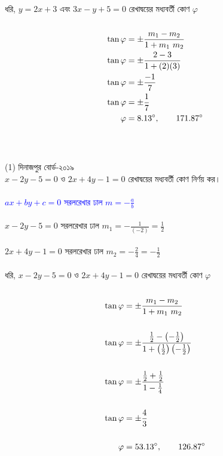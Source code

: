 \documentclass{article}
\begin{document}
\\
ধরি, $y=2x+3$ এবং $3x-y+5=0$ রেখাদ্বয়ের মধ্যবর্তী কোণ $\varphi$\\
\\
\begin{align*}
	\tan \varphi 	&=\pm \frac{m_1-m_2}{1+m_1\,\,m_2}\\
	\tan \varphi 	&=\pm \frac{2-3}{1+(2)(3)}\\
	\tan \varphi 	&=\pm \frac{-1}{7}\\	
	\tan \varphi&=\pm \frac{1}{7}\\	
	\varphi&=8.13\degree,\qquad 171.87\degree
\end{align*}
\\
\\
	(1) দিনাজপুর বোর্ড-২০১৯\\
	$x-2y-5=0$ ও $2x+4y-1=0$ রেখাদ্বয়ের মধ্যবর্তী কোণ নির্ণয় কর। \\ 
	\\ 
	\textcolor{blue}{$ax+by+c=0$ সরলরেখার ঢাল  $m=-\frac{a}{b}$}\\
	\\
		$x-2y-5=0$  সরলরেখার ঢাল $m_1=-\frac{1}{(-2)}=\frac{1}{2}$\\
		\\
	$2x+4y-1=0$  সরলরেখার ঢাল $m_2=-\frac{2}{4}=-\frac{1}{2}$\\
		\\
		ধরি, 	$x-2y-5=0$ ও $2x+4y-1=0$ রেখাদ্বয়ের মধ্যবর্তী কোণ $\varphi$\\
		\\
		\begin{align*}
		\tan \varphi 	&=\pm \frac{m_1-m_2}{1+m_1\,\,m_2}\\
		\\
			\tan \varphi 	&=\pm \frac{\frac{1}{2}-\left(-\frac{1}{2}\right)}{1+\left(\frac{1}{2}\right)\left(-\frac{1}{2}\right)}\\
			\\
			\tan \varphi 	&=\pm \frac{\frac{1}{2}+\frac{1}{2}}{1-\frac{1}{4}}\\	
			\\
			\tan \varphi&=\pm \frac{4}{3}\\
			\\
			\varphi&=53.13\degree,\qquad 126.87\degree
		\end{align*}
\end{document}
